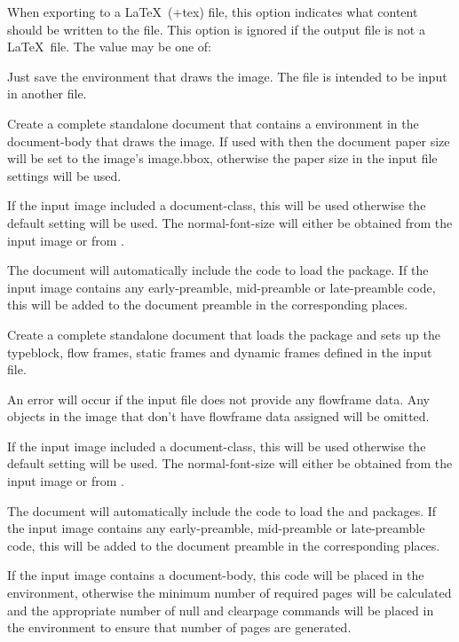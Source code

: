\documentclass[toc=listof]{scrarticle}
\begin{document}
When exporting to a \LaTeX\ (\ext+{tex}) file, this option indicates
what content should be written to the file. This option is ignored
if the output file is not a \LaTeX\ file.
The value may be one of:
\begin{deflist}
\begin{itemdesc}
Just save the  environment that draws the image.
The  file is intended to be \gls{input} in another file.
\end{itemdesc}

\begin{itemdesc}
Create a complete standalone document that contains a
 environment in the \gls{document-body} that draws the image.
If used with  then the document \gls{paper} size will be set
to the image's \gls{image.bbox}, otherwise the paper size in the input
file settings will be used.

If the input image included a \gls{document-class}, this will be used
otherwise the default setting will be used. The
\gls{normal-font-size} will either be obtained from the input image
or from .

The document will automatically include the code to load the
 package.
If the input image contains any \gls{early-preamble}, 
\gls{mid-preamble} or \gls{late-preamble} code, this will be added
to the document preamble in the corresponding places.
\end{itemdesc}

\begin{itemdesc}
Create a complete standalone document that loads the 
package and sets up the \gls{typeblock}, flow frames, static frames
and dynamic frames defined in the input file.

\begin{important}
An error will occur if the input file does not provide any 
\gls{flowframe} data.
Any \glspl{object} in the image that don't have \gls{flowframe} data
assigned will be omitted.
\end{important}

If the input image included a \gls{document-class}, this will be used
otherwise the default setting will be used. The
\gls{normal-font-size} will either be obtained from the input image
or from .

The document will automatically include the code to load the
 and  packages.
If the input image contains any \gls{early-preamble}, 
\gls{mid-preamble} or \gls{late-preamble} code, this will be added
to the document preamble in the corresponding places.

If the input image contains a \gls{document-body}, this code
will be placed in the  environment, otherwise
the minimum number of required pages will be calculated
and the appropriate number of \gls{null} and \gls{clearpage}
commands will be placed in the
 environment to ensure that number of pages are
generated.

\end{itemdesc}

\end{deflist}
\end{document}
